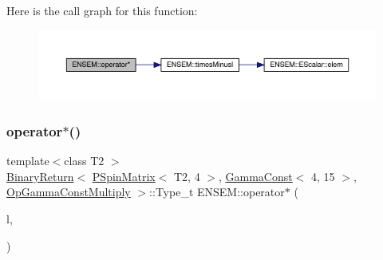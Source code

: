 Here is the call graph for this function\+:\nopagebreak
\begin{figure}[H]
\begin{center}
\leavevmode
\includegraphics[width=350pt]{d6/df5/group__primspinmatrix_ga45919c652c2dae5905f239b2f35eb67c_cgraph}
\end{center}
\end{figure}
\mbox{\label{group__primspinmatrix_ga155437c338ef3cef89bff41046cde747}} 
\subsubsection{\texorpdfstring{operator$\ast$()}{operator*()}\hspace{0.1cm}{\footnotesize\ttfamily [32/64]}}
{\footnotesize\ttfamily template$<$class T2 $>$ \\
\mbox{\hyperlink{structENSEM_1_1BinaryReturn}{Binary\+Return}}$<$ \mbox{\hyperlink{classENSEM_1_1PSpinMatrix}{P\+Spin\+Matrix}}$<$ T2, 4 $>$, \mbox{\hyperlink{classENSEM_1_1GammaConst}{Gamma\+Const}}$<$ 4, 15 $>$, \mbox{\hyperlink{structENSEM_1_1OpGammaConstMultiply}{Op\+Gamma\+Const\+Multiply}} $>$\+::Type\+\_\+t E\+N\+S\+E\+M\+::operator$\ast$ (\begin{DoxyParamCaption}\item[{const \mbox{\hyperlink{classENSEM_1_1PSpinMatrix}{P\+Spin\+Matrix}}$<$ T2, 4 $>$ \&}]{l,  }\item[{const \mbox{\hyperlink{classENSEM_1_1GammaConst}{Gamma\+Const}}$<$ 4, 15 $>$ \&}]{ }\end{DoxyParamCaption})\hspace{0.3cm}{\ttfamily [inline]}}

\mbox{\label{group__primspinmatrix_ga48316ae1067c59ec664fcd1c4d26042a}} 
